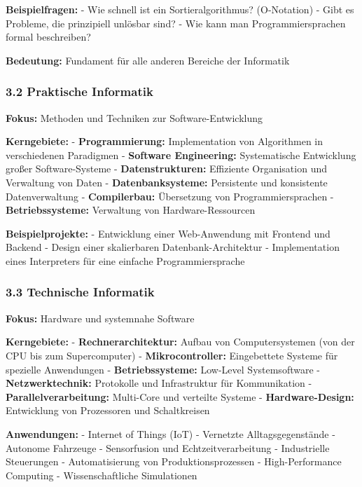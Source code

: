 \documentclass[
  11pt,
  a4paper,
  DIV=11,
  numbers=noendperiod]{scrartcl}
\begin{document}
\textbf{Beispielfragen:} - Wie schnell ist ein Sortieralgorithmus?
(O-Notation) - Gibt es Probleme, die prinzipiell unlösbar sind? - Wie
kann man Programmiersprachen formal beschreiben?

\textbf{Bedeutung:} Fundament für alle anderen Bereiche der Informatik

\subsubsection{3.2 Praktische Informatik}\label{praktische-informatik}

\textbf{Fokus:} Methoden und Techniken zur Software-Entwicklung

\textbf{Kerngebiete:} - \textbf{Programmierung:} Implementation von
Algorithmen in verschiedenen Paradigmen - \textbf{Software Engineering:}
Systematische Entwicklung großer Software-Systeme -
\textbf{Datenstrukturen:} Effiziente Organisation und Verwaltung von
Daten - \textbf{Datenbanksysteme:} Persistente und konsistente
Datenverwaltung - \textbf{Compilerbau:} Übersetzung von
Programmiersprachen - \textbf{Betriebssysteme:} Verwaltung von
Hardware-Ressourcen

\textbf{Beispielprojekte:} - Entwicklung einer Web-Anwendung mit
Frontend und Backend - Design einer skalierbaren Datenbank-Architektur -
Implementation eines Interpreters für eine einfache Programmiersprache

\subsubsection{3.3 Technische Informatik}\label{technische-informatik}

\textbf{Fokus:} Hardware und systemnahe Software

\textbf{Kerngebiete:} - \textbf{Rechnerarchitektur:} Aufbau von
Computersystemen (von der CPU bis zum Supercomputer) -
\textbf{Mikrocontroller:} Eingebettete Systeme für spezielle Anwendungen
- \textbf{Betriebssysteme:} Low-Level Systemsoftware -
\textbf{Netzwerktechnik:} Protokolle und Infrastruktur für Kommunikation
- \textbf{Parallelverarbeitung:} Multi-Core und verteilte Systeme -
\textbf{Hardware-Design:} Entwicklung von Prozessoren und Schaltkreisen

\textbf{Anwendungen:} - Internet of Things (IoT) - Vernetzte
Alltagsgegenstände - Autonome Fahrzeuge - Sensorfusion und
Echtzeitverarbeitung - Industrielle Steuerungen - Automatisierung von
Produktionsprozessen - High-Performance Computing - Wissenschaftliche
Simulationen
\end{document}
